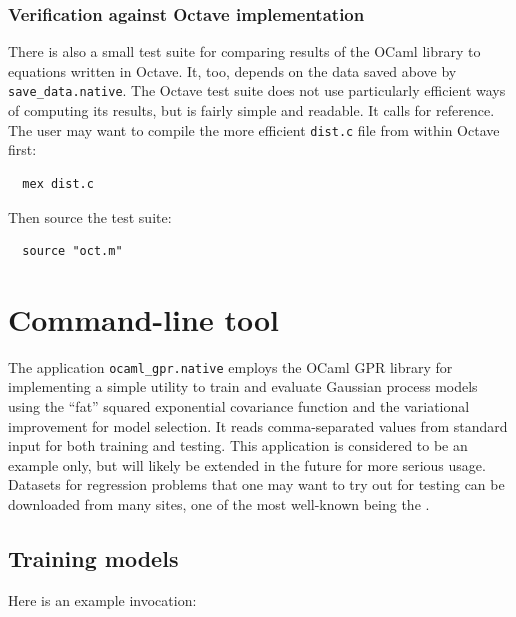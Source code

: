\documentclass[10pt]{report}
\begin{document}
\subsubsection{Verification against Octave implementation}

There is also a small test suite for comparing results of
the OCaml library to equations written in Octave.  It, too,
depends on the data saved above by \verb=save_data.native=.
The Octave test suite does not use particularly efficient ways of
computing its results, but is fairly simple and readable.  It calls
 for reference.  The user may want to compile
the more efficient \verb=dist.c= file from within Octave first:

\begin{verbatim}
  mex dist.c
\end{verbatim}

\noindent Then source the test suite:

\begin{verbatim}
  source "oct.m"
\end{verbatim}

\section{Command-line tool}

The application \verb=ocaml_gpr.native= employs the OCaml GPR library
for implementing a simple utility to train and evaluate Gaussian process
models using the ``fat'' squared exponential covariance function and the
variational improvement \cite{Titsias2009} for model selection.  It reads
comma-separated values from standard input for both training and testing.
This application is considered to be an example only, but will likely be
extended in the future for more serious usage.\\

Datasets for regression problems that one may want to try out for testing can be
downloaded from many sites, one of the most well-known being the
.

\subsection{Training models}

Here is an example invocation:
\end{document}
